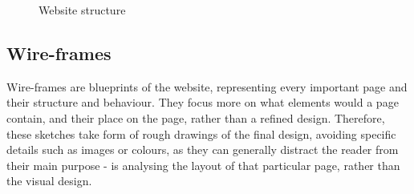 \documentclass{l3proj}
\begin{document}
\begin{figure}[H]
\begin{center}
		\qquad

	\end{center}
	\label{fig:website-structure}
	\caption{Website structure}
\end{figure}

\subsection{Wire-frames}
% 
% 
Wire-frames are blueprints of the website, representing every important page and 
their structure and behaviour.
They focus more on what elements would a page contain, and their place on
the page, rather than a refined design. Therefore, these sketches take form of
rough drawings of the final design, avoiding specific details such as images or
colours, as they can generally distract the reader from their main purpose - is
analysing the layout of that particular page, rather than the visual design.
\end{document}
